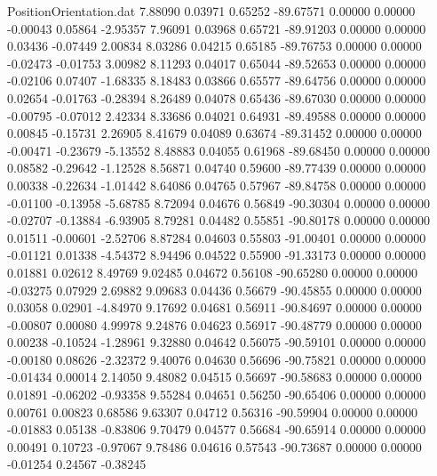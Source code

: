 \begin{filecontents}{PositionOrientation.dat}
   7.88090    0.03971    0.65252   -89.67571    0.00000    0.00000   -0.00043    0.05864   -2.95357
   7.96091    0.03968    0.65721   -89.91203    0.00000    0.00000    0.03436   -0.07449    2.00834
   8.03286    0.04215    0.65185   -89.76753    0.00000    0.00000   -0.02473   -0.01753    3.00982
   8.11293    0.04017    0.65044   -89.52653    0.00000    0.00000   -0.02106    0.07407   -1.68335
   8.18483    0.03866    0.65577   -89.64756    0.00000    0.00000    0.02654   -0.01763   -0.28394
   8.26489    0.04078    0.65436   -89.67030    0.00000    0.00000   -0.00795   -0.07012    2.42334
   8.33686    0.04021    0.64931   -89.49588    0.00000    0.00000    0.00845   -0.15731    2.26905
   8.41679    0.04089    0.63674   -89.31452    0.00000    0.00000   -0.00471   -0.23679   -5.13552
   8.48883    0.04055    0.61968   -89.68450    0.00000    0.00000    0.08582   -0.29642   -1.12528
   8.56871    0.04740    0.59600   -89.77439    0.00000    0.00000    0.00338   -0.22634   -1.01442
   8.64086    0.04765    0.57967   -89.84758    0.00000    0.00000   -0.01100   -0.13958   -5.68785
   8.72094    0.04676    0.56849   -90.30304    0.00000    0.00000   -0.02707   -0.13884   -6.93905
   8.79281    0.04482    0.55851   -90.80178    0.00000    0.00000    0.01511   -0.00601   -2.52706
   8.87284    0.04603    0.55803   -91.00401    0.00000    0.00000   -0.01121    0.01338   -4.54372
   8.94496    0.04522    0.55900   -91.33173    0.00000    0.00000    0.01881    0.02612    8.49769
   9.02485    0.04672    0.56108   -90.65280    0.00000    0.00000   -0.03275    0.07929    2.69882
   9.09683    0.04436    0.56679   -90.45855    0.00000    0.00000    0.03058    0.02901   -4.84970
   9.17692    0.04681    0.56911   -90.84697    0.00000    0.00000   -0.00807    0.00080    4.99978
   9.24876    0.04623    0.56917   -90.48779    0.00000    0.00000    0.00238   -0.10524   -1.28961
   9.32880    0.04642    0.56075   -90.59101    0.00000    0.00000   -0.00180    0.08626   -2.32372
   9.40076    0.04630    0.56696   -90.75821    0.00000    0.00000   -0.01434    0.00014    2.14050
   9.48082    0.04515    0.56697   -90.58683    0.00000    0.00000    0.01891   -0.06202   -0.93358
   9.55284    0.04651    0.56250   -90.65406    0.00000    0.00000    0.00761    0.00823    0.68586
   9.63307    0.04712    0.56316   -90.59904    0.00000    0.00000   -0.01883    0.05138   -0.83806
   9.70479    0.04577    0.56684   -90.65914    0.00000    0.00000    0.00491    0.10723   -0.97067
   9.78486    0.04616    0.57543   -90.73687    0.00000    0.00000   -0.01254    0.24567   -0.38245

\end{filecontents}
